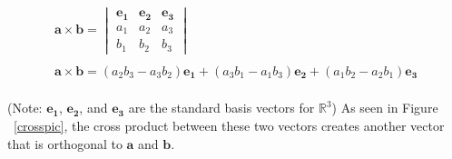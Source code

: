 \documentclass{amsart}
\begin{document}
		\begin{gather}
			\label{cross}
				\mathbf{a} \times \mathbf{b} = 
					\begin{vmatrix} 
					\mathbf{e_1}&\mathbf{e_2}&\mathbf{e_3}\\
					a_1&a_2&a_3\\
					b_1&b_2&b_3
					\end{vmatrix}\\  
			\nonumber \\
			\nonumber
			\mathbf{a} \times \mathbf{b} = (a_2 b_3 - a_3 b_2)\mathbf{e_1} + (a_3 b_1 - a_1 b_3)\mathbf{e_2} + (a_1 b_2 - a_2 b_1)\mathbf{e_3}
		\end{gather}\\

		
		(Note: $\mathbf{e_1}$, $\mathbf{e_2}$, and $\mathbf{e_3}$ are the standard basis vectors for $\mathbb{R}^3$) As seen in Figure ~\ref{crosspic}, the cross product between these two vectors creates another vector that is orthogonal to $\mathbf{a}$ and $\mathbf{b}$.
		

		
\end{document}
